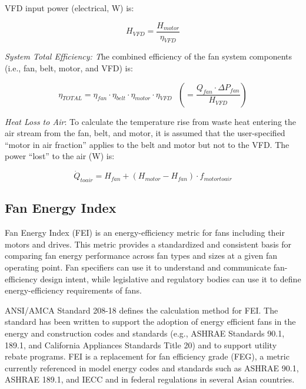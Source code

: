 {{{VFD input power (electrical, W) is:

\begin{equation}
{H_{VFD}} = \frac{{{H_{motor}}}}{{{\eta_{VFD}}}}
\end{equation}

\emph{System Total Efficiency: T}he combined efficiency of the fan system components (i.e., fan, belt, motor, and VFD) is:

\begin{equation}
{\eta_{TOTAL}} = {\eta_{fan}} \cdot {\eta_{belt}} \cdot {\eta_{motor}} \cdot {\eta_{VFD}} ~~~ \left( { = \frac{{{Q_{fan}} \cdot \Delta {P_{fan}}}}{{{H_{VFD}}}}} \right)
\end{equation}

\emph{Heat Loss to Air}: To calculate the temperature rise from waste heat entering the air stream from the fan, belt, and motor, it is assumed that the user-specified ``motor in air fraction'' applies to the belt and motor but not to the VFD. The power ``lost'' to the air (W) is:

\begin{equation}
{\dot Q_{toair}} = {H_{fan}} + \left( {{H_{motor}} - {H_{fan}}} \right) \cdot {f_{motortoair}}
\end{equation}

\subsection{Fan Energy Index}\label{fan-energy-index}

Fan Energy Index (FEI) is an energy-efficiency metric for fans including their motors and drives. This metric provides a standardized and consistent basis for comparing fan energy performance across fan types and sizes at a given fan operating point. Fan specifiers can use it to understand and communicate fan-efficiency design intent, while legislative and regulatory bodies can use it to define energy-efficiency requirements of fans.

ANSI/AMCA Standard 208-18 defines the calculation method for FEI. The standard has been written to support the adoption of energy efficient fans in the energy and construction codes and standards (e.g., ASHRAE Standards 90.1, 189.1, and California Appliances Standards Title 20) and to support utility rebate programs. FEI is a replacement for fan efficiency grade (FEG), a metric currently referenced in model energy codes and standards such as ASHRAE 90.1, ASHRAE 189.1, and IECC and in federal regulations in several Asian countries.

}}}
